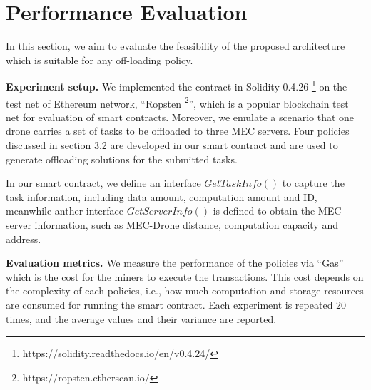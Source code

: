 \section{Performance Evaluation}\label{sec:eva}
In this section, we aim to evaluate the feasibility of the proposed architecture which is suitable for any off-loading policy.

\noindent \textbf{Experiment setup.} We implemented the contract in Solidity 0.4.26 \footnote{https://solidity.readthedocs.io/en/v0.4.24/} on the test net of Ethereum network, “Ropsten \footnote{https://ropsten.etherscan.io/}”, which is a popular blockchain test net for evaluation of smart contracts.
Moreover, we emulate a scenario that one drone carries a set of tasks to be offloaded to three MEC servers. 
Four policies discussed in section 3.2 are developed in our smart contract and are used to generate offloading solutions for the submitted tasks.


In our smart contract, we define an interface $GetTaskInfo()$ to capture the task information, including data amount, computation amount and ID, meanwhile anther interface $GetServerInfo()$ is defined to obtain the MEC server information, such as MEC-Drone distance, computation capacity and address.

\noindent \textbf{Evaluation metrics.}
We measure the performance of the policies via ``Gas'' which is the cost for the miners to execute the transactions. This cost depends on the complexity of each policies, i.e., how much computation and storage resources are consumed for running the smart contract. Each experiment is repeated 20 times, and the average values and their variance are reported.


